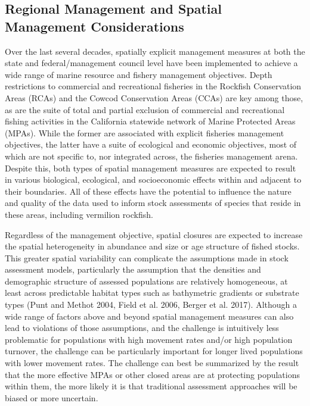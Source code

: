 \documentclass[11pt,
  english,
]{article}
\begin{document}

\hypertarget{regional-management-and-spatial-management-considerations}{%
\subsection{Regional Management and Spatial Management Considerations}\label{regional-management-and-spatial-management-considerations}}

\leavevmode\tagmcend\tagstructend

Over the last several decades, spatially explicit management measures at both the state and federal/management council level have been implemented to achieve a wide range of marine resource and fishery management objectives. Depth restrictions to commercial and recreational fisheries in the Rockfish Conservation Areas (RCAs) and the Cowcod Conservation Areas (CCAs) are key among those, as are the suite of total and partial exclusion of commercial and recreational fishing activities in the California statewide network of Marine Protected Areas (MPAs). While the former are associated with explicit fisheries management objectives, the latter have a suite of ecological and economic objectives, most of which are not specific to, nor integrated across, the fisheries management arena. Despite this, both types of spatial management measures are expected to result in various biological, ecological, and socioeconomic effects within and adjacent to their boundaries. All of these effects have the potential to influence the nature and quality of the data used to inform stock assessments of species that reside in these areas, including vermilion rockfish.

Regardless of the management objective, spatial closures are expected to increase the spatial heterogeneity in abundance and size or age structure of fished stocks. This greater spatial variability can complicate the assumptions made in stock assessment models, particularly the assumption that the densities and demographic structure of assessed populations are relatively homogeneous, at least across predictable habitat types such as bathymetric gradients or substrate types {(Punt and Methot 2004, Field et al. 2006, Berger et al. 2017)\leavevmode\tagmcend\tagstructend}. Although a wide range of factors above and beyond spatial management measures can also lead to violations of those assumptions, and the challenge is intuitively less problematic for populations with high movement rates and/or high population turnover, the challenge can be particularly important for longer lived populations with lower movement rates. The challenge can best be summarized by the result that the more effective MPAs or other closed areas are at protecting populations within them, the more likely it is that traditional assessment approaches will be biased or more uncertain.
\end{document}
